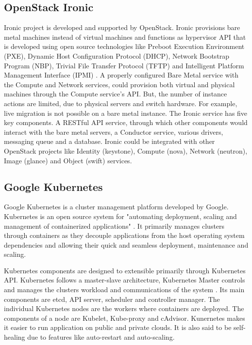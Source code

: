 {\subsection{OpenStack Ironic}

     Ironic project is developed and
     supported by OpenStack. Ironic provisions bare metal machines
     instead of virtual machines and functions as hypervisor API that
     is developed using open source technologies like Preboot
     Execution Environment (PXE), Dynamic Host Configuration Protocol
     (DHCP), Network Bootstrap Program (NBP), Trivial File Transfer
     Protocol (TFTP) and Intelligent Platform Management Interface
     (IPMI) \cite{www-ironicwebsite}. A properly configured Bare
     Metal service with the Compute
     and Network services, could provision both virtual and physical
     machines through the Compute service’s API. But, the number of
     instance actions are limited, due to physical servers and switch
     hardware. For example, live migration is not possible on a bare
     metal instance. The Ironic service has five key components. A
     RESTful API service, through which other components would
     interact with the bare metal servers, a Conductor service,
     various drivers, messaging queue and a database. Ironic could be
     integrated with other OpenStack projects like Identity
     (keystone), Compute (nova), Network (neutron), Image (glance) and
     Object (swift) services.

     \pv
     
\subsection{Google Kubernetes}

     Google Kubernetes is a cluster management platform developed by
     Google. Kubernetes is an open source
     system for "automating deployment, scaling and management of
     containerized applications" \cite{www-kubernetesdoc}. It primarily manages clusters
     through containers as they decouple applications from the
     host operating system dependencies and allowing their quick and
     seamless deployment, maintenance and scaling.

     Kubernetes components are designed to extensible primarily
     through Kubernetes API. Kubernetes follows a master-slave
     architecture, Kubernetes
     Master controls and manages the clusters workload and
     communications of the system \cite{www-kuberneteswiki}.
     Its main components are etcd, API
     server, scheduler and controller manager. The individual
     Kubernetes nodes are the workers where containers are
     deployed. The components of a node are Kubelet, Kube-proxy and
     cAdvisor. Kunernetes makes it easier to run application on public
     and private clouds. It is also said to be self-healing due to
     features like auto-restart and auto-scaling.

}
